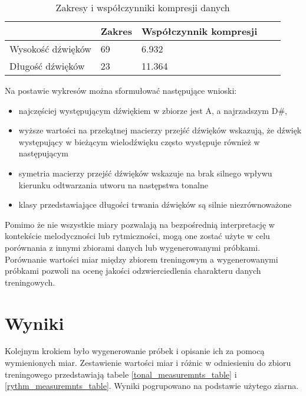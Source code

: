 {{        %
        \begin{table}
            \caption{Zakresy i\,\,współczynniki kompresji danych} \label{range_and_compression}
            \begin{center}
                \begin{tabular}{ |p{2.5cm}|p{2.5cm}|p{2.5cm}|p{2.5cm}|p{2.5cm}| }
                \hline
                 & Zakres & Współczynnik kompresji \\ 
                \hline
                Wysokość dźwięków & 69 & 6.932 \\  
                \hline
                Długość dźwięków & 23 & 11.364 \\
                \hline
                \end{tabular}
            \end{center}
        \end{table}

        \pagebreak

        Na postawie wykresów można sformułować następujące wnioski:
        \begin{itemize}
            \setlength\itemsep{-0.5em}
            \item najczęściej występującym dźwiękiem w\,\,zbiorze jest A, a\,\,najrzadszym D\#,
            \item wyższe wartości na przekątnej macierzy przejść dźwięków wskazują, że dźwięk występujący w\,\,bieżącym wielodźwięku
            często występuje również w\,\,następującym
            \item symetria macierzy przejść dźwięków wskazuje na brak silnego wpływu kierunku odtwarzania utworu na następstwa tonalne
            \item klasy przedstawiające długości trwania dźwięków są silnie niezrównoważone
        \end{itemize}

        Pomimo że nie wszystkie miary pozwalają na bezpośrednią interpretację w kontekście melodyczności lub rytmiczności, 
        mogą one zostać użyte w celu porównania z innymi zbiorami danych lub wygenerowanymi próbkami. 
        Porównanie wartości miar między zbiorem treningowym a wygenerowanymi próbkami pozwoli na ocenę 
        jakości odzwierciedlenia charakteru danych treningowych.
    }

    \section{Wyniki}
    {
        Kolejnym krokiem było wygenerowanie próbek i\,\,opisanie ich za pomocą wymienionych miar. Zestawienie wartości miar i\,\,różnic
        w\,\,odniesieniu do zbioru treningowego przedstawiają tabele \ref{tonal_measuremnts_table} i\,\,\ref{rythm_measuremnts_table}. Wyniki pogrupowano na podstawie użytego ziarna.

}}
